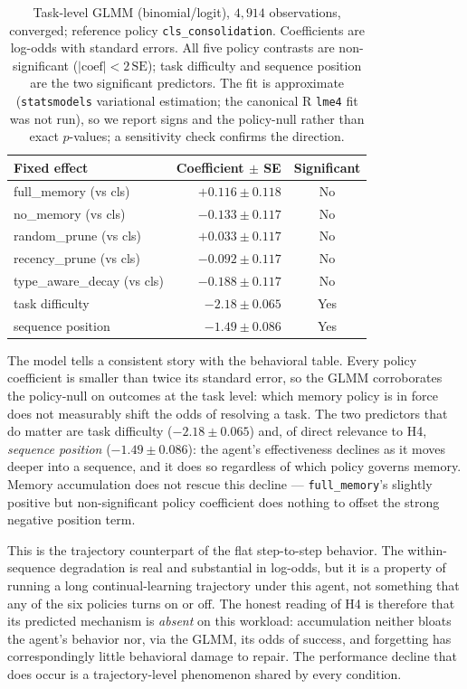 \begin{table}[htbp]
  \centering
  \caption{Task-level GLMM (binomial/logit), $4{,}914$ observations, converged; reference
  policy \texttt{cls\_consolidation}. Coefficients are log-odds with standard errors. All
  five policy contrasts are non-significant ($|\text{coef}| < 2\,\text{SE}$); task
  difficulty and sequence position are the two significant predictors. The fit is
  approximate (\texttt{statsmodels} variational estimation; the canonical R \texttt{lme4}
  fit was not run), so we report signs and the policy-null rather than exact $p$-values; a
  sensitivity check confirms the direction.}
  \label{tab:glmm}
  \begin{tabular}{lrc}
    \toprule
    Fixed effect & Coefficient $\pm$ SE & Significant \\
    \midrule
    full\_memory (vs cls)       & $+0.116 \pm 0.118$ & No \\
    no\_memory (vs cls)         & $-0.133 \pm 0.117$ & No \\
    random\_prune (vs cls)      & $+0.033 \pm 0.117$ & No \\
    recency\_prune (vs cls)     & $-0.092 \pm 0.117$ & No \\
    type\_aware\_decay (vs cls) & $-0.188 \pm 0.117$ & No \\
    \midrule
    task difficulty             & $-2.18 \pm 0.065$  & Yes \\
    sequence position           & $-1.49 \pm 0.086$  & Yes \\
    \bottomrule
  \end{tabular}
\end{table}

The model tells a consistent story with the behavioral table. Every policy coefficient is
smaller than twice its standard error, so the GLMM corroborates the policy-null on outcomes
at the task level: which memory policy is in force does not measurably shift the odds of
resolving a task. The two predictors that do matter are task difficulty
($-2.18 \pm 0.065$) and, of direct relevance to H4, \emph{sequence position}
($-1.49 \pm 0.086$): the agent's effectiveness declines as it moves deeper into a sequence,
and it does so regardless of which policy governs memory. Memory accumulation does not
rescue this decline --- \texttt{full\_memory}'s slightly positive but non-significant
policy coefficient does nothing to offset the strong negative position term.

This is the trajectory counterpart of the flat step-to-step behavior. The within-sequence
degradation is real and substantial in log-odds, but it is a property of running a long
continual-learning trajectory under this agent, not something that any of the six policies
turns on or off. The honest reading of H4 is therefore that its predicted mechanism is
\emph{absent} on this workload: accumulation neither bloats the agent's behavior nor, via
the GLMM, its odds of success, and forgetting has correspondingly little behavioral damage
to repair. The performance decline that does occur is a trajectory-level phenomenon shared
by every condition.
